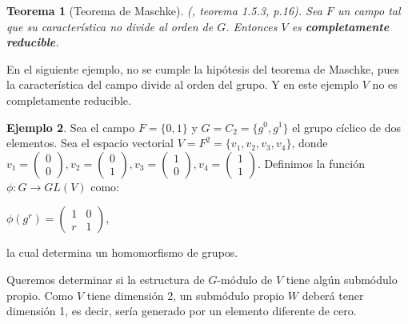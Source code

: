 \documentclass[12pt]{book}
\newtheorem{theorem}{Teorema}[section]
\theoremstyle{definition}
\newtheorem{example}[theorem]{Ejemplo}
\newcounter{in}
\newcounter{ini}
\begin{document}
\begin{theorem}[Teorema de Maschke]{\normalfont
    (\cite{sagan2001symmetric}, teorema 1.5.3, p.16)}. 
  \label{maschke}
  Sea $F$ un campo tal que su característica no
  divide al orden de $G$. %
  Entonces $V$ es \textbf{completamente reducible}.
\end{theorem}
En el siguiente ejemplo, no se cumple la hipótesis del teorema de
Maschke, pues la característica del campo divide al orden del
grupo. Y en este ejemplo $V$ no es completamente reducible.
\begin{example}
  \label{ej-no-reducibilidad}
  Sea el campo $F=\{0,1\}$ y $G=C_{2}=\{g^{0},g^{1}\}$ el grupo
  cíclico de dos elementos. Sea el espacio vectorial
  $V=F^{2}=\{v_{1},v_{2},v_{3},v_{4}\}$, donde  
  $v_{1}=
  \begin{pmatrix}
    0\\
    0  
  \end{pmatrix},
  v_{2}=
  \begin{pmatrix}
    0\\
    1  
  \end{pmatrix},
  v_{3}=
  \begin{pmatrix}
    1\\
    0  
  \end{pmatrix},
  v_{4}=
  \begin{pmatrix}
    1\\
    1  
  \end{pmatrix}.
  $
  Definimos la función $\phi:G\rightarrow GL(V)$ como:
  \begin{center}
    $\phi(g^{r})=
    \begin{pmatrix}
      1 & 0 \\
      r & 1 
    \end{pmatrix}$,
  \end{center}
  la cual determina un homomorfismo de grupos.

Queremos determinar si la estructura de $G$-módulo de $V$ tiene algún submódulo propio. Como $V$
tiene dimensión 2, un submódulo propio $W$ deberá tener dimensión 1,
es decir, sería generado por un elemento diferente de cero.



\end{example}
\end{document}
